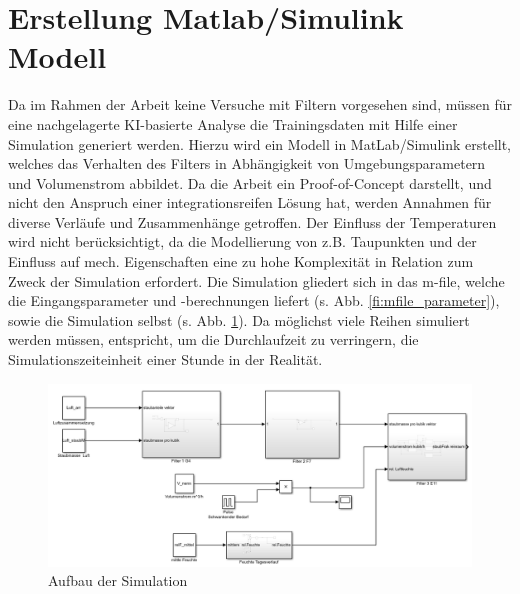     \section{Erstellung Matlab/Simulink Modell}
    \label{sec:sim}
    Da im Rahmen der Arbeit keine Versuche mit Filtern vorgesehen sind, müssen für eine nachgelagerte KI-basierte Analyse die Trainingsdaten mit Hilfe einer Simulation generiert werden. Hierzu wird ein Modell in MatLab/Simulink erstellt, welches das Verhalten des Filters in Abhängigkeit von Umgebungsparametern und Volumenstrom abbildet. Da die Arbeit ein Proof-of-Concept darstellt, und nicht den Anspruch einer integrationsreifen Lösung hat, werden Annahmen für diverse Verläufe und Zusammenhänge getroffen. Der Einfluss der Temperaturen wird nicht berücksichtigt, da die Modellierung von z.B. Taupunkten und der Einfluss auf mech. Eigenschaften eine zu hohe Komplexität in Relation zum Zweck der Simulation erfordert. Die Simulation gliedert sich in das m-file, welche die Eingangsparameter und -berechnungen liefert (s. Abb. \ref{fi:mfile_parameter}), sowie die Simulation selbst (s. Abb. \ref{fi:sim_aufbau}). Da möglichst viele Reihen simuliert werden müssen, entspricht, um die Durchlaufzeit zu verringern, die Simulationszeiteinheit einer Stunde in der Realität.
    \begin{figure}[H]
        \begin{center}
            \includegraphics[width=\linewidth]{images/sim_aufbau.png}
            \caption[Aufbau Simulation]{Aufbau der Simulation}
            \label{fi:sim_aufbau}
        \end{center}
    \end{figure}
